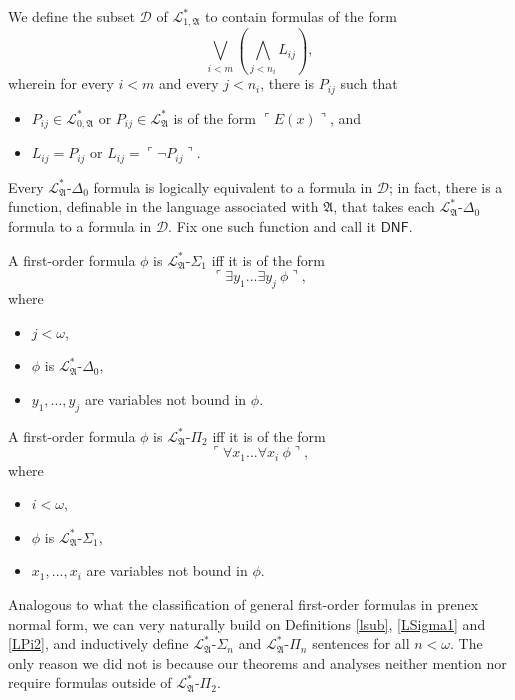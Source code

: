 \documentclass[12pt]{article}
\numberwithin{equation}{section}
\begin{document}
\begin{defi}
We define the subset $\mathcal{D}$ of $\mathcal{L}^{*}_{1, \mathfrak{A}}$ to contain formulas of the form $$\bigvee_{i < m} (\bigwedge_{j < n_i} L_{ij}),$$ wherein for every $i < m$ and every $j < n_i$, there is $P_{ij}$ such that
\begin{itemize}
    \item $P_{ij} \in \mathcal{L}^{*}_{0, \mathfrak{A}}$ or $P_{ij} \in \mathcal{L}^{*}_{\mathfrak{A}}$ is of the form $\ulcorner E(x) \urcorner$, and 
    \item $L_{ij} = P_{ij}$ or $L_{ij} = \ulcorner \neg P_{ij} \urcorner$.
\end{itemize}
Every $\mathcal{L}^{*}_{\mathfrak{A}}$-$\Delta_0$ formula is logically equivalent to a formula in $\mathcal{D}$; in fact, there is a function, definable in the language associated with $\mathfrak{A}$, that takes each $\mathcal{L}^{*}_{\mathfrak{A}}$-$\Delta_0$ formula to a formula in $\mathcal{D}$. Fix one such function and call it $\mathsf{DNF}$.  
\end{defi}

\begin{defi}\label{LSigma1}
A first-order formula $\phi$ is $\mathcal{L}^{*}_{\mathfrak{A}}$-$\Sigma_1$ iff it is of the form $$\ulcorner \exists y_1 ... \exists y_j \ \phi \urcorner,$$
where 
\begin{itemize}
    \item $j < \omega$,
    \item $\phi$ is $\mathcal{L}^{*}_{\mathfrak{A}}$-$\Delta_0$,
    \item $y_1, ..., y_j$ are variables not bound in $\phi$.
\end{itemize}
\end{defi}

\begin{defi}\label{LPi2}
A first-order formula $\phi$ is $\mathcal{L}^{*}_{\mathfrak{A}}$-$\Pi_2$ iff it is of the form $$\ulcorner \forall x_1 ... \forall x_i \ \phi \urcorner,$$
where 
\begin{itemize}
    \item $i < \omega$,
    \item $\phi$ is $\mathcal{L}^{*}_{\mathfrak{A}}$-$\Sigma_1$,
    \item $x_1, ..., x_i$ are variables not bound in $\phi$.
\end{itemize}
\end{defi}

\begin{rem}\label{snpn}
Analogous to what the classification of general first-order formulas in prenex normal form, we can very naturally build on Definitions \ref{lsub}, \ref{LSigma1} and \ref{LPi2}, and inductively define $\mathcal{L}^{*}_{\mathfrak{A}}$-$\Sigma_n$ and $\mathcal{L}^{*}_{\mathfrak{A}}$-$\Pi_n$ sentences for all $n < \omega$. The only reason we did not is because our theorems and analyses neither mention nor require formulas outside of $\mathcal{L}^{*}_{\mathfrak{A}}$-$\Pi_2$.  
\end{rem}
\end{document}
